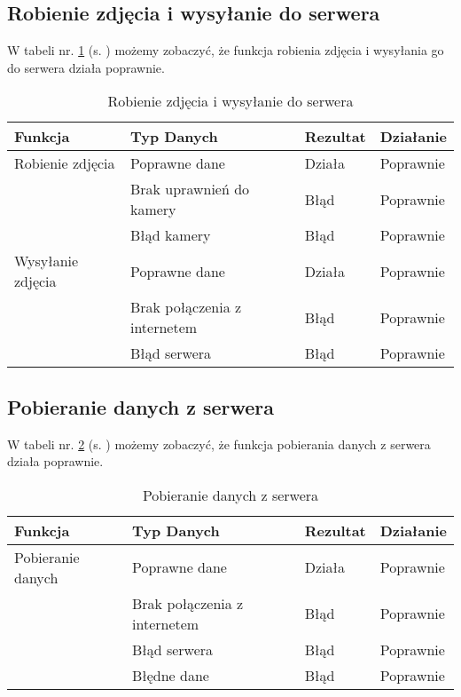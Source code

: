\subsection{Robienie zdjęcia i wysyłanie do serwera}
W tabeli nr. \ref{tab:tabelka011} (s. \pageref{tab:tabelka011}) możemy zobaczyć, że funkcja robienia zdjęcia i wysyłania go do serwera działa poprawnie.
\begin{table}[h!]
	\centering
	\begin{tabularx}{\textwidth}{|X|>{\arraybackslash}m{}|X|X|}
		\hline
		\textbf{Funkcja}  & \textbf{Typ Danych}          & \textbf{Rezultat} & \textbf{Działanie} \\ \hline
		Robienie zdjęcia  & Poprawne dane                & Działa            & Poprawnie          \\ \hline
		                  & Brak uprawnień do kamery     & Błąd              & Poprawnie          \\ \hline
		                  & Błąd kamery                  & Błąd              & Poprawnie          \\ \hline
		Wysyłanie zdjęcia & Poprawne dane                & Działa            & Poprawnie          \\ \hline
		                  & Brak połączenia z internetem & Błąd              & Poprawnie          \\ \hline
		                  & Błąd serwera                 & Błąd              & Poprawnie          \\ \hline
	\end{tabularx}
	\caption{Robienie zdjęcia i wysyłanie do serwera}
	\label{tab:tabelka011}
\end{table}

\subsection{Pobieranie danych z serwera}
W tabeli nr. \ref{tab:tabelka012} (s. \pageref{tab:tabelka012}) możemy zobaczyć, że funkcja pobierania danych z serwera działa poprawnie.
\begin{table}[h!]
	\centering
	\begin{tabularx}{\textwidth}{|X|>{\arraybackslash}m{}|X|X|}
		\hline
		\textbf{Funkcja}  & \textbf{Typ Danych}          & \textbf{Rezultat} & \textbf{Działanie} \\ \hline
		Pobieranie danych & Poprawne dane                & Działa            & Poprawnie          \\ \hline
		                  & Brak połączenia z internetem & Błąd              & Poprawnie          \\ \hline
		                  & Błąd serwera                 & Błąd              & Poprawnie          \\ \hline
		                  & Błędne dane                  & Błąd              & Poprawnie          \\ \hline
	\end{tabularx}
	\caption{Pobieranie danych z serwera}
	\label{tab:tabelka012}
\end{table}
\newpage
